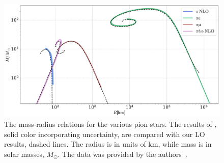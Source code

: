 \begin{figure}[H]
    \centering
    \includegraphics[width=.85\textwidth]{../scripts/figurer/pion_star/mass_radius_brandt_all.pdf}
    \caption{
        The mass-radius relations for the various pion stars.
        The results of \citeauthor{brandtNewClassCompact2018}, solid color incorporating uncertainty, are compared with our LO results, dashed lines.
        The radius is in units of $\text{km}$, while mass is in solar masses, $M_\odot$.
        The data was provided by the authors~\autocite{brandtNewClassCompact2018}.
    }
    \label{fig: brandt mass-radius}
\end{figure}



